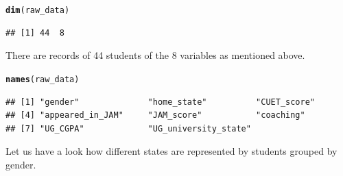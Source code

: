 \documentclass[11pt, a4paper]{article}\usepackage[]{graphicx}\usepackage[]{xcolor}
\makeatletter
\newcommand{\hldef}[1]{\textcolor[rgb]{0.345,0.345,0.345}{#1}}%
\newcommand{\hlkwd}[1]{\textcolor[rgb]{0.737,0.353,0.396}{\textbf{#1}}}%
\newenvironment{kframe}{%
 \def\at@end@of@kframe{}%
 \ifinner\ifhmode%
  \def\at@end@of@kframe{\end{minipage}}%
  \begin{minipage}{\columnwidth}%
 \fi\fi%
 \def\FrameCommand##1{\hskip\@totalleftmargin \hskip-\fboxsep
 \colorbox{shadecolor}{##1}\hskip-\fboxsep
     \hskip-\linewidth \hskip-\@totalleftmargin \hskip\columnwidth}%
 \MakeFramed {\advance\hsize-\width
   \@totalleftmargin\z@ \linewidth\hsize
   \@setminipage}}%
 {\par\unskip\endMakeFramed%
 \at@end@of@kframe}
\newenvironment{knitrout}{}{} %
\makeatother
\begin{document}
\begin{knitrout}
\color{fgcolor}\begin{kframe}
\begin{alltt}
\hlkwd{dim}\hldef{(raw_data)}
\end{alltt}
\begin{verbatim}
## [1] 44  8
\end{verbatim}
\end{kframe}
\end{knitrout}
There are records of 44 students of the 8 variables as mentioned above.

\begin{knitrout}
\color{fgcolor}\begin{kframe}
\begin{alltt}
\hlkwd{names}\hldef{(raw_data)}
\end{alltt}
\begin{verbatim}
## [1] "gender"              "home_state"          "CUET_score"         
## [4] "appeared_in_JAM"     "JAM_score"           "coaching"           
## [7] "UG_CGPA"             "UG_university_state"
\end{verbatim}
\end{kframe}
\end{knitrout}

\newpage


Let us have a look how different states are represented by students grouped by gender.
\end{document}

